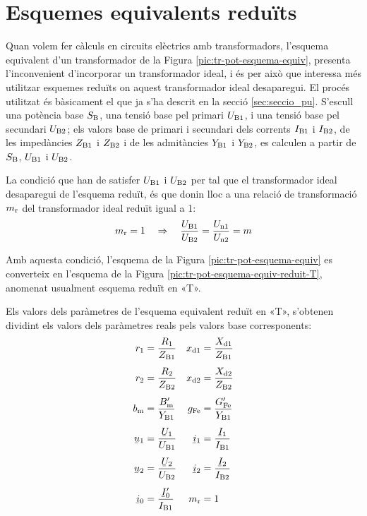 \section{Esquemes equivalents reduïts}

Quan  volem fer càlculs en circuits elèctrics amb transformadors, l'esquema equivalent d'un transformador de la Figura  \vref{pic:tr-pot-esquema-equiv}, presenta l'inconvenient d'incorporar un transformador ideal, i és per això que interessa més utilitzar esquemes reduïts on aquest transformador ideal desaparegui.
El procés utilitzat és bàsicament el que ja s'ha descrit en la secció \vref{sec:seccio_pu}. S'escull una potència base $S_\mathrm{B}$, una tensió base pel primari $U_\mathrm{B1}$, i una tensió base pel secundari $U_\mathrm{B2}$; els valors base de primari i secundari dels corrents $I_\mathrm{B1}$ i $I_\mathrm{B2}$, de les impedàncies $Z_\mathrm{B1}$ i $Z_\mathrm{B2}$ i de les admitàncies $Y_\mathrm{B1}$ i $Y_\mathrm{B2}$, es calculen a partir de $S_\mathrm{B}$, $U_\mathrm{B1}$ i $U_\mathrm{B2}$.

La condició que han de satisfer $U_\mathrm{B1}$ i $U_\mathrm{B2}$ per tal que el transformador ideal desaparegui de l'esquema reduït, és que donin lloc a una relació de transformació $m_\mathrm{r}$ del transformador ideal reduït igual a  1:
\begin{equation}\label{eq:mr}
    m_\mathrm{r} = 1 \quad \Rightarrow \quad \frac{U_\mathrm{B1}}{U_\mathrm{B2}} = \frac{U_\mathrm{n1}}{U_\mathrm{n2}} = m
\end{equation}

 Amb aquesta condició, l'esquema de la Figura \vref{pic:tr-pot-esquema-equiv} es converteix en l'esquema de la Figura
\vref{pic:tr-pot-esquema-equiv-reduit-T}, anomenat usualment esquema reduït en «T».

\begin{center}
    
    \label{pic:tr-pot-esquema-equiv-reduit-T}
\end{center}

Els valors dels paràmetres de l'esquema equivalent reduït en «T», s'obtenen dividint els valors dels paràmetres reals pels valors base corresponents:
\begin{align}
    r\ped{1} &=\frac{R\ped{1}}{Z\ped{B1}} &   x\ped{d1} &=\frac{X\ped{d1}}{Z\ped{B1}} \\[1ex]
    r\ped{2} &=\frac{R\ped{2}}{Z\ped{B2}} &   x\ped{d2} &=\frac{X\ped{d2}}{Z\ped{B2}} \\[1ex]
    b\ped{m} &=\frac{B\ped{m}'}{Y\ped{B1}}  &   g\ped{Fe} &=\frac{G\ped{Fe}'}{Y\ped{B1}} \\[1ex]
    \cmplx{u}_1 &=\frac{\cmplx{U}_1}{U\ped{B1}} &   \cmplx{i}_1 &=\frac{\cmplx{I}_1}{I\ped{B1}} \\[1ex]
    \cmplx{u}_2 &=\frac{\cmplx{U}_2}{U\ped{B2}} &   \cmplx{i}_2 &=\frac{\cmplx{I}_2}{I\ped{B2}} \\[1ex]
    \cmplx{i}_0 &=\frac{\cmplx{I}_0'}{I\ped{B1}} &   m\ped{r} &=1
\end{align}

